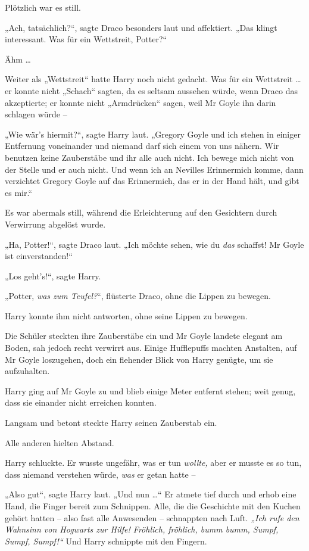 {Plötzlich war es still.

„Ach, tatsächlich?“, sagte Draco besonders laut und affektiert. „Das klingt interessant. Was für ein Wettstreit, Potter?“

Ähm …

Weiter als „Wettstreit“ hatte Harry noch nicht gedacht. Was für ein Wettstreit … er konnte nicht „Schach“ sagten, da es seltsam aussehen würde, wenn Draco das akzeptierte; er konnte nicht „Armdrücken“ sagen, weil Mr Goyle ihn darin schlagen würde --

„Wie wär's hiermit?“, sagte Harry laut. „Gregory Goyle und ich stehen in einiger Entfernung voneinander und niemand darf sich einem von uns nähern. Wir benutzen keine Zauberstäbe und ihr alle auch nicht. Ich bewege mich nicht von der Stelle und er auch nicht. Und wenn ich an Nevilles Erinnermich komme, dann verzichtet Gregory Goyle auf das Erinnermich, das er in der Hand hält, und gibt es mir.“

Es war abermals still, während die Erleichterung auf den Gesichtern durch Verwirrung abgelöst wurde.

„Ha, Potter!“, sagte Draco laut. „Ich möchte sehen, wie du \emph{das} schaffst! Mr Goyle ist einverstanden!“

„Los geht's!“, sagte Harry.

„Potter, \emph{was zum Teufel?}“, flüsterte Draco, ohne die Lippen zu bewegen.

Harry konnte ihm nicht antworten, ohne seine Lippen zu bewegen.

Die Schüler steckten ihre Zauberstäbe ein und Mr Goyle landete elegant am Boden, sah jedoch recht verwirrt aus. Einige Hufflepuffs machten Anstalten, auf Mr Goyle loszugehen, doch ein flehender Blick von Harry genügte, um sie aufzuhalten.

Harry ging auf Mr Goyle zu und blieb einige Meter entfernt stehen; weit genug, dass sie einander nicht erreichen konnten.

Langsam und betont steckte Harry seinen Zauberstab ein.

Alle anderen hielten Abstand.

Harry schluckte. Er wusste ungefähr, was er tun \emph{wollte,} aber er musste es so tun, dass niemand verstehen würde, \emph{was} er getan hatte --

„Also gut“, sagte Harry laut. „Und nun …“ Er atmete tief durch und erhob eine Hand, die Finger bereit zum Schnippen. Alle, die die Geschichte mit den Kuchen gehört hatten -- also fast alle Anwesenden -- schnappten nach Luft. \emph{„Ich rufe den Wahnsinn von Hogwarts zur Hilfe! Fröhlich, fröhlich, bumm bumm, Sumpf, Sumpf, Sumpf!“} Und Harry schnippte mit den Fingern.

}
